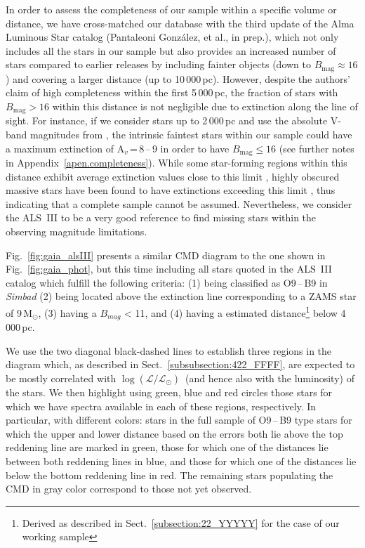 \documentclass{aa}
\newcommand{\MSol}{\mbox{M$_\odot$}}
\newcommand{\logLs}{$\log (\mathcal{L}/\mathcal{L}_{\odot})$}
\begin{document}
In order to assess the completeness of our sample within a specific volume or distance, we have cross-matched our database with the third update of the Alma Luminous Star catalog (Pantaleoni González, et al., in prep.), which not only includes all the stars in our sample but also provides an increased number of stars compared to earlier releases by including fainter objects (down to $B_{\text{mag}} \approx 16$) and covering a larger distance (up to 10\,000\,pc). However, despite the authors' claim of high completeness within the first 5\,000\,pc, the fraction of stars with $B_{\text{mag}} > 16$ within this distance is not negligible due to extinction along the line of sight. For instance, if we consider stars up to 2\,000\,pc and use the absolute V-band magnitudes from \citet{1968ApJS...17..371L}, the intrinsic faintest stars within our sample could have a maximum extinction of A$_{v}$\,=\,8\,--\,9 in order to have $B_{\text{mag}} \leq 16$ (see further notes in Appendix~\ref{apen.completeness}). While some star-forming regions within this distance exhibit average extinction values close to this limit \citep[e.g. Cyg-OB2, A$_{v}$\,=\,5\,--\,7,][]{1991AJ....101.1408M}, highly obscured massive stars have been found to have extinctions exceeding this limit \citep[see, e.g.,][]{2020MNRAS.495.3323C}, thus indicating that a complete sample cannot be assumed. Nevertheless, we consider the ALS~III to be a very good reference to find missing stars within the observing magnitude limitations.

Fig.~\ref{fig:gaia_alsIII} presents a similar CMD diagram to the one shown in Fig.~\ref{fig:gaia_phot}, but this time including all stars quoted in the ALS~III catalog which fulfill the following criteria: (1) being classified as O9\,--\,B9 in \textit{Simbad} (2) being located above the extinction line corresponding to a ZAMS star of 9\,\MSol, (3) having a $B_{mag}$ < 11, and (4) having a estimated distance\footnote{Derived as described in Sect.~\ref{subsection:22_YYYYY} for the case of our working sample} below 4\,000\,pc.

We use the two diagonal black-dashed lines to establish three regions in the diagram which, as described in Sect.~\ref{subsubsection:422_FFFF}, are expected to be mostly correlated with \logLs\ (and hence also with the luminosity) of the stars. We then highlight using green, blue and red circles those stars for which we have spectra available in each of these regions, respectively. In particular, with different colors: stars in the full sample of O9\,--\,B9 type 
stars for which the upper and lower distance based on the errors both lie above the top reddening line are marked in green, those for which one of the distances lie between both reddening lines in blue, and those for which one of the distances lie below the bottom reddening line in red. The remaining stars populating the CMD in gray color correspond to those not yet observed.
\end{document}
